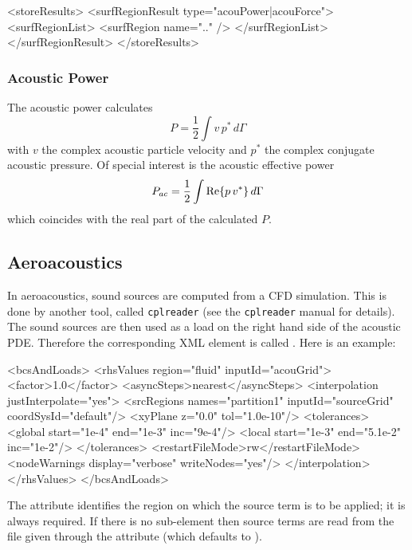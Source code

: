 \begin{xmllisting}
<storeResults>
  <surfRegionResult type="acouPower|acouForce">
    <surfRegionList>
      <surfRegion name=".." />
    </surfRegionList>
  </surfRegionResult>
</storeResults>
\end{xmllisting}

\subsubsection{Acoustic Power}
The acoustic power calculates
\begin{equation}
  P = \frac{1}{2} \int v\, p^*\,d\Gamma \nonumber
\end{equation}
with $v$ the complex acoustic particle velocity and $p^*$ the complex conjugate
acoustic pressure. Of special interest is the acoustic effective power
\begin{equation}
  P_{ac} = \frac{1}{2} \int {\rm Re} \lbrace p\, v^* \rbrace \,d\Gamma \nonumber
\end{equation}
which coincides with the real part of the calculated $P$.


\subsection{Aeroacoustics}
In aeroacoustics, sound sources are computed from a CFD simulation. This is
done by another tool, called \texttt{cplreader} (see the \texttt{cplreader}
manual for details). The sound sources are then used as a load on the right
hand side of the acoustic PDE. Therefore the corresponding XML element is
called . Here is an example:

\begin{xmllisting}
<bcsAndLoads>
 <rhsValues region="fluid" inputId="acouGrid">
  <factor>1.0</factor>
  <asyncSteps>nearest</asyncSteps>
  <interpolation justInterpolate="yes">
    <srcRegions names="partition1" inputId="sourceGrid" coordSysId="default"/>
    <xyPlane z="0.0" tol="1.0e-10"/>
    <tolerances>
      <global start="1e-4" end="1e-3" inc="9e-4"/>
      <local start="1e-3" end="5.1e-2" inc="1e-2"/>
    </tolerances>
    <restartFileMode>rw</restartFileMode>
    <nodeWarnings display="verbose" writeNodes="yes"/>
  </interpolation>
 </rhsValues>
</bcsAndLoads>
\end{xmllisting}

The attribute  identifies the region on which the source term
is to be applied; it is always required. If there is no sub-element
 then source terms are read from the file given
through
the attribute  (which defaults to ).

